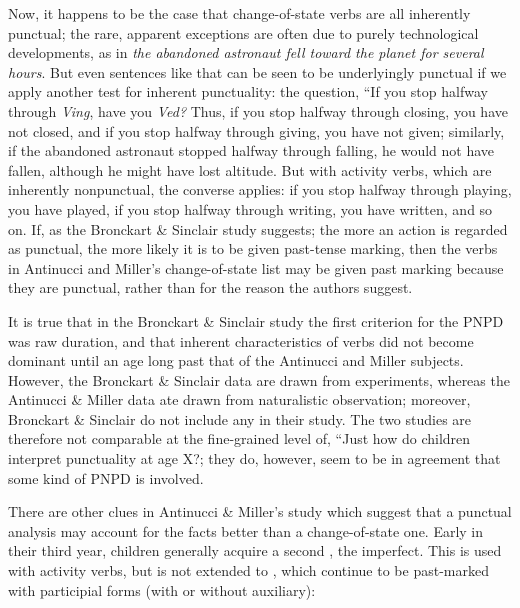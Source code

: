 Now, it happens to be the case that change-of-state verbs are all inherently punctual; the rare, apparent exceptions are often due to purely technological developments, as in \textit{the abandoned astronaut fell toward the planet for several hours}. But even sentences like that can be seen to be underlyingly punctual if we apply another test for inherent punctuality: the question, ``If you stop halfway through \textit{Ving}, have you \textit{Ved?} Thus, if you stop halfway through closing, you have not closed, and if you stop halfway through giving, you have not given; similarly, if the abandoned astronaut stopped halfway through falling, he would not have fallen, although he might have lost altitude. But with activity verbs, which are inherently nonpunctual, the converse applies: if you stop halfway through playing, you have played, if you stop halfway through writing, you have written, and so on. If, as the Bronckart \& Sinclair study suggests; the more an action is regarded as punctual, the more likely it is to be given past-tense marking, then the verbs in Antinucci and Miller's change-of-state list may be given past marking because they are punctual, rather than for the reason the authors suggest.

It is true that in the Bronckart \& Sinclair study the first criterion for the PNPD was raw duration, and that inherent characteristics of verbs did not become dominant until an age long past that of the Antinucci and Miller subjects. However, the Bronckart \& Sinclair data are drawn from experiments, whereas the Antinucci \& Miller data ate drawn from naturalistic observation; moreover, Bronckart \& Sinclair do not include any  in their study. The two studies are therefore not comparable at the fine-grained level of, ``Just how do children interpret punctuality at age X?; they do, however, seem to be in agreement that some kind of PNPD is involved.

There are other clues in Antinucci \& Miller's study which
suggest that a punctual analysis may account for the facts better than a change-of-state one. Early in their third year,  children generally acquire a second  , the imperfect. This is used with activity verbs, but is not extended to , which continue to be past-marked with participial forms (with or without auxiliary):


